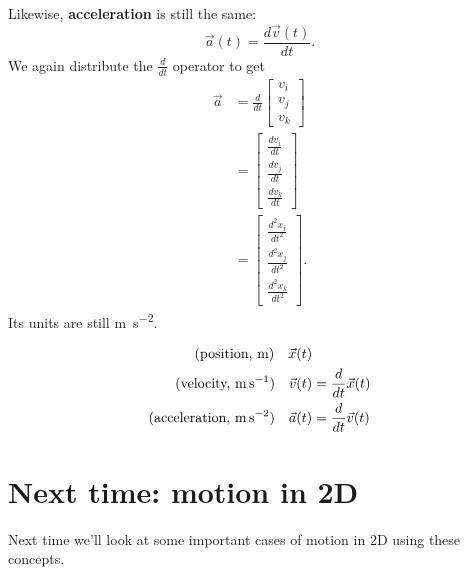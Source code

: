 \documentclass{tufte-handout}
\newcommand\myroot{..}
\begin{document}
Likewise, \textbf{acceleration} is still the same:
\begin{equation}
\vec{a}(t) = \dfrac{d\vec{v}(t)}{dt}.
\end{equation}
We again distribute the $\frac{d}{dt}$ operator to get
\begin{align}
\vec{a} &= \frac{d}{dt} \begin{bmatrix} v_i \\ v_j \\ v_k \end{bmatrix} \\
&= \begin{bmatrix} \frac{dv_i}{dt} \\ \frac{dv_j}{dt} \\ \frac{dv_k}{dt} \end{bmatrix}\\
&= \begin{bmatrix} \frac{d^2x_i}{dt^2} \\ \frac{d^2x_j}{dt^2} \\ \frac{d^2x_k}{dt^2} \end{bmatrix}.
\end{align}
Its units are still \si{\meter\per\second\squared}. 

\begin{align}
\text{(position, \si{\meter})}\quad \vec{x}(t) & \\
\text{(velocity, \si{\meter\per\second})}\quad \vec{v}(t) &= \frac{d}{dt} \vec{x}(t) \\
\text{(acceleration, \si{\meter\per\second\squared})}\quad \vec{a}(t) &= \frac{d}{dt} \vec{v}(t)
\end{align}

\section{Next time: motion in 2D}
Next time we'll look at some important cases of motion in 2D using these concepts. 

\nocite{carroll2019spacetime, einstein1915relativity}

\end{document}
